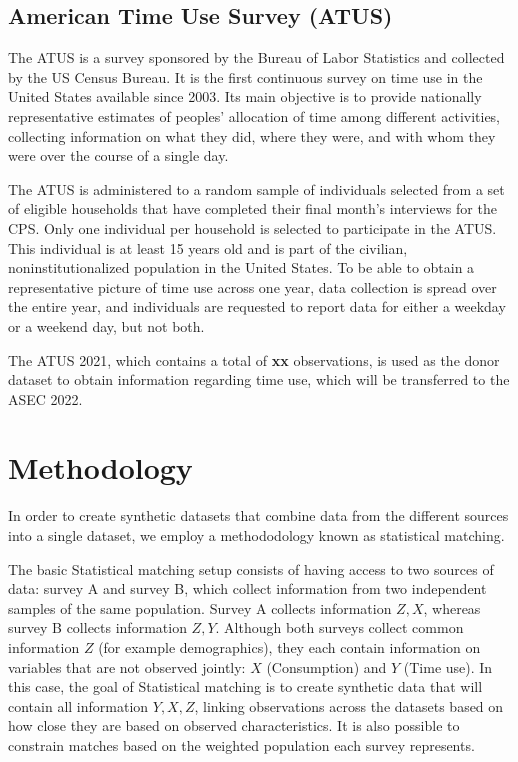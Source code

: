 \documentclass[
  11pt,
]{article}
\begin{document}
\subsection{American Time Use Survey
(ATUS)}\label{american-time-use-survey-atus}

The ATUS is a survey sponsored by the Bureau of Labor Statistics and
collected by the US Census Bureau. It is the first continuous survey on
time use in the United States available since 2003. Its main objective
is to provide nationally representative estimates of peoples' allocation
of time among different activities, collecting information on what they
did, where they were, and with whom they were over the course of a
single day.

The ATUS is administered to a random sample of individuals selected from
a set of eligible households that have completed their final month's
interviews for the CPS. Only one individual per household is selected to
participate in the ATUS. This individual is at least 15 years old and is
part of the civilian, noninstitutionalized population in the United
States. To be able to obtain a representative picture of time use across
one year, data collection is spread over the entire year, and
individuals are requested to report data for either a weekday or a
weekend day, but not both.

The ATUS 2021, which contains a total of \textbf{xx} observations, is
used as the donor dataset to obtain information regarding time use,
which will be transferred to the ASEC 2022.

\section{Methodology}\label{methodology}

In order to create synthetic datasets that combine data from the
different sources into a single dataset, we employ a methododology known
as statistical matching.

The basic Statistical matching setup consists of having access to two
sources of data: survey A and survey B, which collect information from
two independent samples of the same population. Survey A collects
information \(Z, X\), whereas survey B collects information \(Z, Y\).
Although both surveys collect common information \(Z\) (for example
demographics), they each contain information on variables that are not
observed jointly: \(X\) (Consumption) and \(Y\) (Time use). In this
case, the goal of Statistical matching is to create synthetic data that
will contain all information \(Y,X, Z\), linking observations across the
datasets based on how close they are based on observed characteristics.
It is also possible to constrain matches based on the weighted
population each survey represents.
\end{document}
